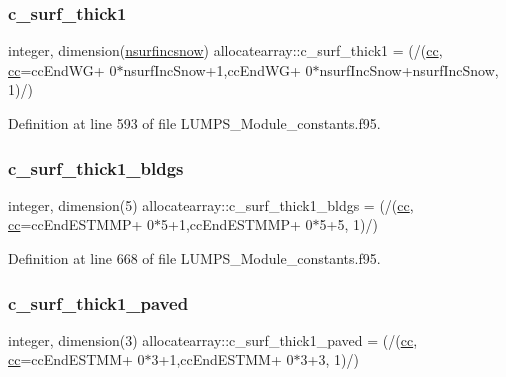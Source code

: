 \subsubsection{\texorpdfstring{c\+\_\+surf\+\_\+thick1}{c\_surf\_thick1}}
{\footnotesize\ttfamily integer, dimension(\hyperlink{namespaceallocatearray_af4d113f332b6759cfa22271140c9162d}{nsurfincsnow}) allocatearray\+::c\+\_\+surf\+\_\+thick1 = (/(\hyperlink{namespaceallocatearray_ac863c81704eb507dee10f5e10741e10c}{cc}, \hyperlink{namespaceallocatearray_ac863c81704eb507dee10f5e10741e10c}{cc}=cc\+End\+WG+ 0$\ast$nsurf\+Inc\+Snow+1,cc\+End\+WG+ 0$\ast$nsurf\+Inc\+Snow+nsurf\+Inc\+Snow, 1)/)}



Definition at line 593 of file L\+U\+M\+P\+S\+\_\+\+Module\+\_\+constants.\+f95.

\mbox{\label{namespaceallocatearray_ac6eb5a733ab48407dd1b0cd5d0bf4780}} 
\subsubsection{\texorpdfstring{c\+\_\+surf\+\_\+thick1\+\_\+bldgs}{c\_surf\_thick1\_bldgs}}
{\footnotesize\ttfamily integer, dimension(5) allocatearray\+::c\+\_\+surf\+\_\+thick1\+\_\+bldgs = (/(\hyperlink{namespaceallocatearray_ac863c81704eb507dee10f5e10741e10c}{cc}, \hyperlink{namespaceallocatearray_ac863c81704eb507dee10f5e10741e10c}{cc}=cc\+End\+E\+S\+T\+M\+MP+ 0$\ast$5+1,cc\+End\+E\+S\+T\+M\+MP+ 0$\ast$5+5, 1)/)}



Definition at line 668 of file L\+U\+M\+P\+S\+\_\+\+Module\+\_\+constants.\+f95.

\mbox{\label{namespaceallocatearray_ab7f395250f896fcc5d16741a18d89d89}} 
\subsubsection{\texorpdfstring{c\+\_\+surf\+\_\+thick1\+\_\+paved}{c\_surf\_thick1\_paved}}
{\footnotesize\ttfamily integer, dimension(3) allocatearray\+::c\+\_\+surf\+\_\+thick1\+\_\+paved = (/(\hyperlink{namespaceallocatearray_ac863c81704eb507dee10f5e10741e10c}{cc}, \hyperlink{namespaceallocatearray_ac863c81704eb507dee10f5e10741e10c}{cc}=cc\+End\+E\+S\+T\+MM+ 0$\ast$3+1,cc\+End\+E\+S\+T\+MM+ 0$\ast$3+3, 1)/)}



